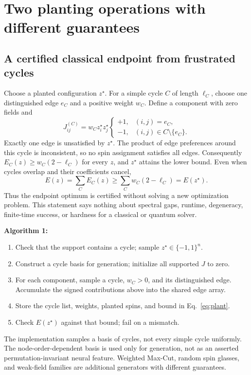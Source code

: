 \documentclass[10pt]{article}
\newcommand{\code}[1]{\texttt{\detokenize{#1}}}
\newenvironment{algsteps}[1]{\par\smallskip\noindent\textbf{Algorithm #1}\begin{enumerate}\setlength{\itemsep}{2pt}\setlength{\parskip}{1pt}}{\end{enumerate}\smallskip}
\begin{document}
\newpage
\section{Two planting operations with different guarantees}

\subsection{A certified classical endpoint from frustrated cycles}
Choose a planted configuration $z^\star$. For a simple cycle $C$ of length
$\ell_C$, choose one distinguished edge $e_C$ and a positive weight $w_C$.
Define a component with zero fields and
\begin{equation}
 J_{ij}^{(C)}=w_C z_i^\star z_j^\star
 \begin{cases}
 +1,&(i,j)=e_C,\\[-2pt]
 -1,&(i,j)\in C\setminus\{e_C\}.
 \end{cases}
\end{equation}
Exactly one edge is unsatisfied by $z^\star$. The product of edge preferences
around this cycle is inconsistent, so no spin assignment satisfies all edges.
Consequently $E_C(z)\ge w_C(2-\ell_C)$ for every $z$, and $z^\star$ attains
the lower bound. Even when cycles overlap and their coefficients cancel,
\begin{equation}
 E(z)=\sum_C E_C(z)\ge\sum_Cw_C(2-\ell_C)=E(z^\star).
 \label{eq:plant}
\end{equation}
Thus the endpoint optimum is certified without solving a new optimization
problem. This statement says nothing about spectral gaps, runtime, degeneracy,
finite-time success, or hardness for a classical or quantum solver.

\begin{algsteps}{1: \code{planted_loops(n, edges, rng, num_loops)}}
\item Check that the support contains a cycle; sample $z^\star\in\{-1,1\}^n$.
\item Construct a cycle basis for generation; initialize all supported $J$ to zero.
\item For each component, sample a cycle, $w_C>0$, and its distinguished edge.
       Accumulate the signed contributions above into the shared edge array.
\item Store the cycle list, weights, planted spins, and bound in Eq.~\eqref{eq:plant}.
\item Check $E(z^\star)$ against that bound; fail on a mismatch.
\end{algsteps}
The implementation samples a basis of cycles, not every simple cycle uniformly.
The node-order-dependent basis is used only for generation, not as an asserted
permutation-invariant neural feature. Weighted Max-Cut, random spin glasses,
and weak-field families are additional generators with different guarantees.
\end{document}
